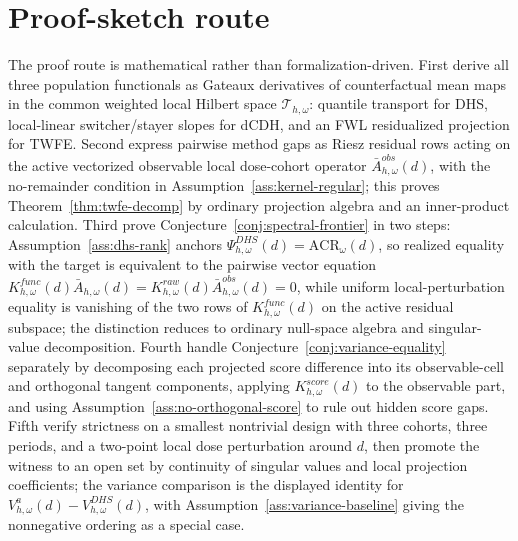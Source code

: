\documentclass[11pt]{article}
\theoremstyle{definition}
\theoremstyle{plain}
\theoremstyle{remark}
\begin{document}
\section{Proof-sketch route}
The proof route is mathematical rather than formalization-driven. First derive all three population functionals as Gateaux derivatives of counterfactual mean maps in the common weighted local Hilbert space \(\mathcal T_{h,\omega}\): quantile transport for DHS, local-linear switcher/stayer slopes for dCDH, and an FWL residualized projection for TWFE. Second express pairwise method gaps as Riesz residual rows acting on the active vectorized observable local dose-cohort operator \(\bar A^{obs}_{h,\omega}(d)\), with the no-remainder condition in Assumption~\ref{ass:kernel-regular}; this proves Theorem~\ref{thm:twfe-decomp} by ordinary projection algebra and an inner-product calculation. Third prove Conjecture~\ref{conj:spectral-frontier} in two steps: Assumption~\ref{ass:dhs-rank} anchors \(\Psi^{DHS}_{h,\omega}(d)=\mathrm{ACR}_\omega(d)\), so realized equality with the target is equivalent to the pairwise vector equation \(K^{func}_{h,\omega}(d)\bar A_{h,\omega}(d)=K^{raw}_{h,\omega}(d)\bar A^{obs}_{h,\omega}(d)=0\), while uniform local-perturbation equality is vanishing of the two rows of \(K^{func}_{h,\omega}(d)\) on the active residual subspace; the distinction reduces to ordinary null-space algebra and singular-value decomposition. Fourth handle Conjecture~\ref{conj:variance-equality} separately by decomposing each projected score difference into its observable-cell and orthogonal tangent components, applying \(K^{score}_{h,\omega}(d)\) to the observable part, and using Assumption~\ref{ass:no-orthogonal-score} to rule out hidden score gaps. Fifth verify strictness on a smallest nontrivial design with three cohorts, three periods, and a two-point local dose perturbation around \(d\), then promote the witness to an open set by continuity of singular values and local projection coefficients; the variance comparison is the displayed identity for \(V^a_{h,\omega}(d)-V^{DHS}_{h,\omega}(d)\), with Assumption~\ref{ass:variance-baseline} giving the nonnegative ordering as a special case.
\end{document}
